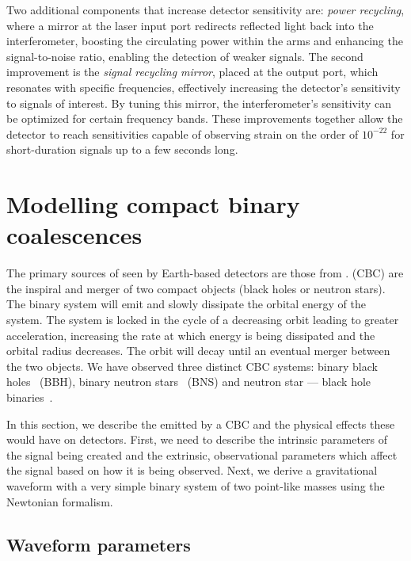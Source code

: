 Two additional components that increase detector sensitivity are: \textit{power recycling}, where a mirror at the laser input port redirects reflected light back into the interferometer, boosting the circulating power within the arms and enhancing the signal-to-noise ratio, enabling the detection of weaker \gwadj signals. The second improvement is the \textit{signal recycling mirror}, placed at the output port, which resonates with specific \gwadj frequencies, effectively increasing the detector's sensitivity to signals of interest. By tuning this mirror, the interferometer's sensitivity can be optimized for certain frequency bands. These improvements together allow the detector to reach sensitivities capable of observing strain on the order of $10^{-22}$ for short-duration signals up to a few seconds long.

\section{\label{1:sec:modelling_CBC}Modelling compact binary coalescences}

The primary sources of \gws seen by Earth-based \gwadj detectors are those from \cbcs. \Cbcs (CBC) are the inspiral and merger of two compact objects (black holes or neutron stars). The binary system will emit \gws and slowly dissipate the orbital energy of the system. The system is locked in the cycle of a decreasing orbit leading to greater acceleration, increasing the rate at which energy is being dissipated and the orbital radius decreases. The orbit will decay until an eventual merger between the two objects. We have observed three distinct CBC systems: binary black holes~\cite{GW150914:2016} (BBH), binary neutron stars~\cite{GW170817:2017} (BNS) and neutron star — black hole binaries~\cite{nsbh:2021}. 

In this section, we describe the \gws emitted by a CBC and the physical effects these would have on \gwadj detectors. First, we need to describe the intrinsic parameters of the \gwadj signal being created and the extrinsic, observational parameters which affect the signal based on how it is being observed. Next, we derive a gravitational waveform with a very simple binary system of two point-like masses using the Newtonian formalism.

\subsection{\label{1:sec:CBC-parameters}Waveform parameters}

